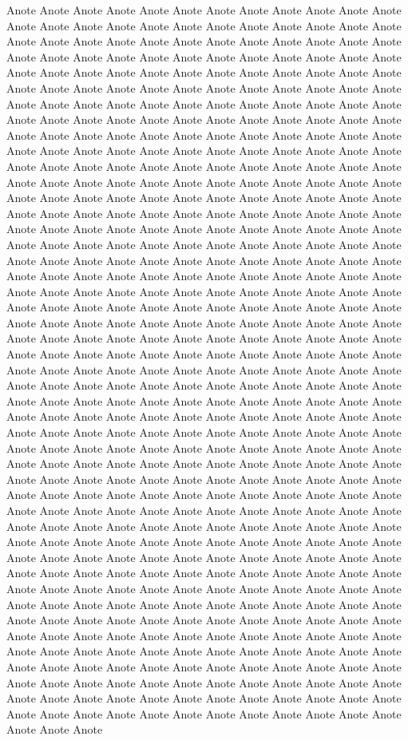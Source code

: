 \documentclass[11pt,a4paper]{book}
\begin{document}
Anote Anote Anote Anote Anote Anote Anote Anote Anote Anote Anote Anote Anote Anote Anote Anote Anote Anote Anote Anote Anote Anote Anote Anote Anote Anote Anote Anote Anote Anote Anote Anote Anote Anote Anote Anote Anote Anote Anote Anote Anote Anote Anote Anote Anote Anote Anote Anote Anote Anote Anote Anote Anote Anote Anote Anote Anote Anote Anote Anote Anote Anote Anote Anote Anote Anote Anote Anote Anote Anote Anote Anote Anote Anote Anote Anote Anote Anote Anote Anote Anote Anote Anote Anote Anote Anote Anote Anote Anote Anote Anote Anote Anote Anote Anote Anote Anote Anote Anote Anote Anote Anote Anote Anote Anote Anote Anote Anote Anote Anote Anote Anote Anote Anote Anote Anote Anote Anote Anote Anote Anote Anote Anote Anote Anote Anote Anote Anote Anote Anote Anote Anote Anote Anote Anote Anote Anote Anote Anote Anote Anote Anote Anote Anote Anote Anote Anote Anote Anote Anote Anote Anote Anote Anote Anote Anote Anote Anote Anote Anote Anote Anote Anote Anote Anote Anote Anote Anote Anote Anote Anote Anote Anote Anote Anote Anote Anote Anote Anote Anote Anote Anote Anote Anote Anote Anote Anote Anote Anote Anote Anote Anote Anote Anote Anote Anote Anote Anote Anote Anote Anote Anote Anote Anote Anote Anote Anote Anote Anote Anote Anote Anote Anote Anote Anote Anote Anote Anote Anote Anote Anote Anote Anote Anote Anote Anote Anote Anote Anote Anote Anote Anote Anote Anote Anote Anote Anote Anote Anote Anote Anote Anote Anote Anote Anote Anote Anote Anote Anote Anote Anote Anote Anote Anote Anote Anote Anote Anote Anote Anote Anote Anote Anote Anote Anote Anote Anote Anote Anote Anote Anote Anote Anote Anote Anote Anote Anote Anote Anote Anote Anote Anote Anote Anote Anote Anote Anote Anote Anote Anote Anote Anote Anote Anote Anote Anote Anote Anote Anote Anote Anote Anote Anote Anote Anote Anote Anote Anote Anote Anote Anote Anote Anote Anote Anote Anote Anote Anote Anote Anote Anote Anote Anote Anote Anote Anote Anote Anote Anote Anote Anote Anote Anote Anote Anote Anote Anote Anote Anote Anote Anote Anote Anote Anote Anote Anote Anote Anote Anote Anote  Anote Anote Anote Anote Anote Anote Anote Anote Anote Anote Anote Anote Anote Anote Anote Anote Anote Anote Anote Anote Anote Anote Anote Anote Anote Anote Anote Anote Anote Anote Anote Anote Anote Anote Anote Anote Anote Anote Anote Anote Anote Anote Anote Anote Anote Anote Anote Anote Anote Anote Anote Anote Anote Anote Anote Anote Anote Anote Anote Anote Anote Anote Anote Anote Anote Anote Anote Anote Anote Anote Anote Anote Anote Anote Anote Anote Anote Anote Anote Anote Anote Anote Anote Anote Anote Anote Anote Anote Anote Anote Anote Anote Anote Anote Anote Anote Anote Anote Anote Anote Anote Anote Anote Anote Anote Anote Anote Anote Anote Anote Anote Anote Anote Anote Anote Anote Anote Anote Anote Anote Anote Anote Anote Anote Anote Anote Anote Anote Anote Anote Anote Anote Anote Anote Anote Anote Anote Anote Anote Anote Anote Anote Anote Anote Anote Anote Anote Anote Anote Anote Anote Anote Anote Anote Anote Anote Anote Anote Anote Anote Anote Anote Anote Anote Anote Anote Anote Anote Anote Anote Anote Anote Anote Anote Anote Anote Anote Anote Anote Anote Anote Anote Anote Anote Anote Anote Anote Anote Anote Anote Anote Anote Anote Anote Anote Anote Anote Anote Anote Anote Anote Anote Anote Anote Anote 
\end{document}
